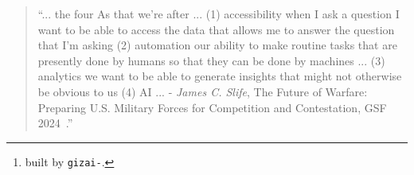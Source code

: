 \begin{quote}
\enquote{... the four As that we're after ... (1) accessibility when I ask a question I want to be able to access the data that allows me to answer the question that I'm asking (2) automation our ability to make routine tasks that are presently done by humans so that they can be done by machines ... (3) analytics we want to be able to generate insights that might not otherwise be obvious to us (4) AI ... - \emph{James C. Slife}, The Future of Warfare: Preparing U.S. Military Forces for Competition and Contestation, GSF 2024~\cite{Slife24}.}
\end{quote}


\begin{abstract}
First, we develop a mathematical model to discuss the four As in Section~\ref{theory}. Then, we propose expansions for Access and Automation in Sections~\ref{access} and \ref{automation}, respectively. We briefly review a proposed view of Analytics as Access to the outputs of Automation in Section~\ref{analytics}. Finally, in Section~\ref{ai}, we review a reference implementation of the proposed framework~\cite{abcli} based on \emph{Bash}~\cite{gnu_bash} expansions that call into \emph{Python}~\cite{python} in multiple AI applications~\footnote{built by \texttt{gizai-\revision}.}.
\end{abstract}


